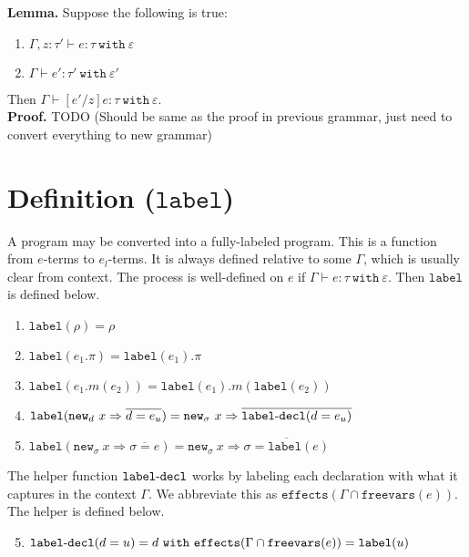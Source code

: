 \documentclass{llncs}
\newcommand{\keywadj}[1]{\mathtt{#1}}
\newcommand{\keyw}[1]{\keywadj{#1}~}
\newcommand{\kw}[1]{\keyw{ #1 }}
\newcommand{\kwa}[1]{\keywadj{ #1 }}
\newcommand{\hyphen}{\hbox{-}}
\newcommand{\type}[2]{
	#1~\keyw{with} #2
}
\begin{document}
\textbf{Lemma. } Suppose the following is true: 

\begin{enumerate}
	\item $\Gamma, z : \tau' \vdash e : \tau~\keyw{with} \varepsilon$
	\item $\Gamma \vdash e' : \tau'~\keyw{with} \varepsilon'$
\end{enumerate}
	
	\noindent
Then $\Gamma \vdash [e'/z]e : \tau~\keyw{with} \varepsilon$.\\

\noindent
\textbf{Proof.} TODO (Should be same as the proof in previous grammar, just need to convert everything to new grammar)






\section{Definition ($\keywadj{label}$)}
A program may be converted into a fully-labeled program. This is a function from $e$-terms to $e_l$-terms. It is always defined relative to some $\Gamma$, which is usually clear from context. The process is well-defined on $e$ if $\Gamma \vdash e : \type{\tau}{\varepsilon}$. Then $\kwa{label}$ is defined below.

\begin{enumerate}
	\item $\kwa{label}(\rho) = \rho$
	\item $\kwa{label}(e_1.\pi) = \kwa{label}(e_1).\pi$
	\item $\kwa{label}(e_1.m(e_2)) = \kwa{label}(e_1).m(\kwa{label}(e_2))$
	\item $\kwa{label}(\kwa{new}_d~x \Rightarrow \overline{d = e_u}) = \kwa{new}_\sigma~x \Rightarrow \overline{ \kwa{label \hyphen decl}(d = e_u) }$
	\item $\kwa{label}(\kwa{new}_\sigma~x \Rightarrow \overline{\sigma = e}) = \kwa{new}_\sigma~x \Rightarrow \overline{\sigma = \kwa{label}(e)}$
\end{enumerate}

\noindent
The helper function $\kwa{label \hyphen decl}$ works by labeling each declaration with what it captures in the context $\Gamma$. We abbreviate this as $\kwa{effects}(\Gamma \cap \kwa{freevars}(e))$. The helper is defined below.

\begin{enumerate}
  \setcounter{enumi}{4}
  \item $\kwa{label \hyphen decl}(d = u) = d~\kw{with} \kwa{effects}(\Gamma \cap \kwa{freevars}(e)) = \kwa{label}(u)$
\end{enumerate}
\end{document}
